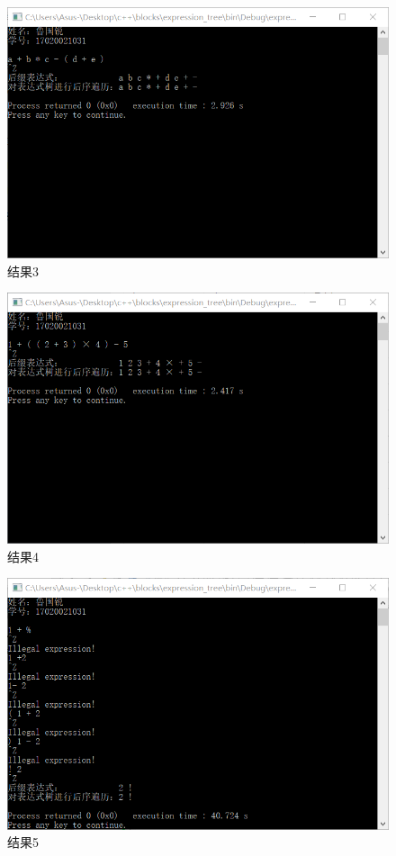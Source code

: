 \documentclass[UTF8]{ctexart}
\begin{document}
\begin{figure}[H]
	\centering 
	\includegraphics[scale=0.85]{res3.png} 
	\caption{结果3} 
	\label{res3}
\end{figure}

\begin{figure}[H]
	\centering 
	\includegraphics[scale=0.85]{res4.png} 
	\caption{结果4} 
	\label{res4}
\end{figure}

\begin{figure}[H]
	\centering 
	\includegraphics[scale=0.85]{res5.png} 
	\caption{结果5} 
	\label{res5}
\end{figure}
\end{document}
